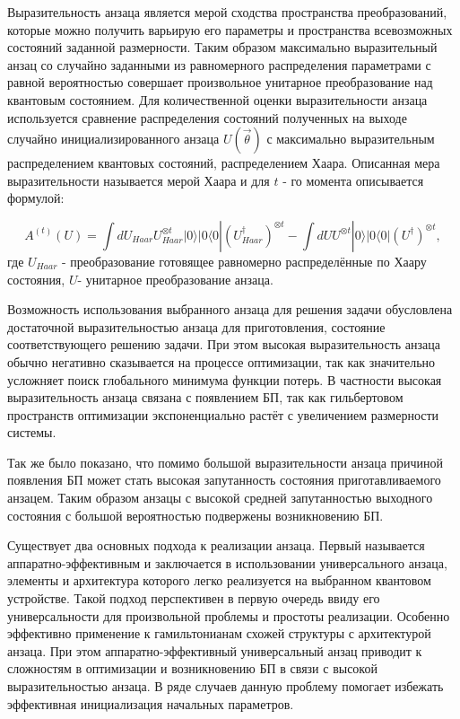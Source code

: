 \documentclass[14pt]{extarticle}
\begin{document}
\qquad Выразительность анзаца является мерой сходства пространства преобразований, которые можно получить варьирую его параметры и пространства всевозможных состояний заданной размерности. Таким образом максимально выразительный анзац со случайно заданными из равномерного распределения параметрами с равной вероятностью совершает произвольное унитарное преобразование над квантовым состоянием. Для количественной оценки выразительности анзаца используется сравнение распределения состояний полученных на выходе случайно инициализированного анзаца $U(\vec \theta)$ с максимально выразительным распределением квантовых состояний, распределением Хаара. Описанная мера выразительности называется мерой Хаара \cite{_yczkowski_2005} и для $t$ - го момента описывается формулой:

\begin{equation}
A^{(t)}(U) = \int dU_{Haar}U^{\otimes t}_{Haar} |0 \rangle |0 \langle 0 | {(U^{\dagger}_{Haar})}^{\otimes t} - \int dU U^{\otimes t} |0 \rangle |0 \langle 0 | {(U^{\dagger})}^{\otimes t},
\end{equation} где $U_{Haar}$ - преобразование готовящее равномерно распределённые по Хаару состояния, $U$- унитарное преобразование анзаца.

\qquad Возможность использования выбранного анзаца для решения задачи обусловлена достаточной выразительностью анзаца для приготовления, состояние соответствующего решению задачи. При этом высокая выразительность анзаца обычно негативно сказывается на процессе оптимизации, так как значительно усложняет поиск глобального минимума функции потерь. В частности высокая выразительность анзаца связана с появлением БП, так как гильбертовом пространств оптимизации  экспоненциально растёт с увеличением размерности системы.

\qquad Так же было показано, что помимо большой выразительности анзаца причиной появления БП может стать высокая запутанность состояния приготавливаемого анзацем. Таким образом анзацы с высокой средней запутанностью выходного состояния с большой вероятностью подвержены возникновению БП.

\qquad Существует два основных подхода к реализации анзаца. Первый называется аппаратно-эффективным и заключается в использовании универсального анзаца, элементы и архитектура которого легко реализуется на выбранном квантовом устройстве. Такой подход перспективен в первую очередь ввиду его универсальности для произвольной проблемы и простоты реализации. Особенно эффективно применение к гамильтонианам схожей структуры с архитектурой анзаца. При этом аппаратно-эффективный универсальный анзац приводит к сложностям в оптимизации и возникновению БП в связи с высокой выразительностью анзаца. В ряде случаев данную проблему помогает избежать эффективная инициализация начальных параметров.
\end{document}
